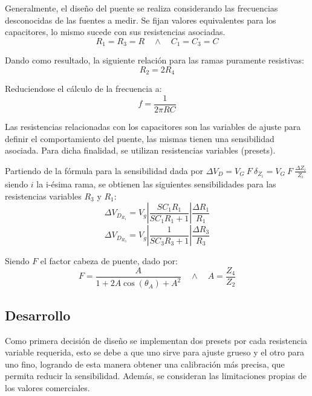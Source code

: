 Generalmente, el diseño del puente se realiza considerando las frecuencias desconocidas de las fuentes a medir. Se fijan valores equivalentes para los capacitores, lo mismo sucede con sus resistencias asociadas. 
\begin{equation}
R_1=R_3=R \quad	\wedge \quad C_1=C_3=C
\end{equation}

Dando como resultado, la siguiente relación para las ramas puramente resistivas:
\begin{equation}
R_2=2R_4
\end{equation}

Reduciendose el cálculo de la frecuencia a:
\begin{equation}
f=\frac{1}{2\pi RC}
\label{frec}
\end{equation}

Las resistencias relacionadas con los capacitores son las variables de ajuste para definir el comportamiento del puente, las mismas tienen una sensibilidad asociada. Para dicha finalidad, se utilizan resistencias variables (presets). 

Partiendo de la fórmula para la sensibilidad dada por $\Delta V_D=V_G \ F \ \delta_{Z_i}=V_G \ F \ \frac{\Delta Z_i}{Z_i}$ siendo $i$ la i-ésima rama, se obtienen las siguientes sensibilidades para las resistencias variables $R_3$ y $R_1$:
\begin{equation}
\Delta V_{D_{R_1}}=V_g\left|\frac{SC_1R_1}{SC_1R_1+1}\right|\frac{\Delta R_1}{R_1}
\end{equation}
\begin{equation}
\Delta V_{D_{R_3}}=V_g\left|\frac{1}{SC_3R_3+1}\right|\frac{\Delta R_3}{R_3}
\end{equation}

Siendo $F$ el factor cabeza de puente, dado por:
\begin{equation}
F=\frac{A}{1+2A\cos(\theta_A)+A^2} \quad \wedge \quad A=\frac{Z_4}{Z_2}
\label{cabeza_de_puente}
\end{equation} 

\subsection{Desarrollo}

Como primera decisión de diseño se implementan dos presets por cada resistencia variable requerida, esto se debe a que uno sirve para ajuste grueso y el otro para uno fino, logrando de esta manera obtener una calibración más precisa, que permita reducir la sensibilidad. Además, se consideran las limitaciones propias de los valores comerciales.

